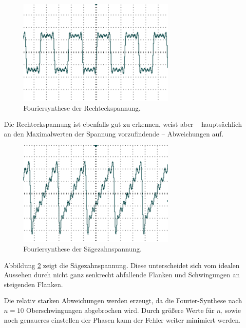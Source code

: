 \begin{figure}
	\centering
		\includegraphics[width=0.7\textwidth]{Bilder/1-9_RE.pdf}		
\caption{Fouriersynthese der Rechteckspannung.}
	\label{fig:1-9_RE}
\end{figure}
Die Rechteckspannung ist ebenfalls gut zu erkennen, weist aber -- hauptsächlich an den Maximalwerten der Spannung vorzufindende -- Abweichungen auf. 

\begin{figure}
	\centering
		\includegraphics[width=0.7\textwidth]{Bilder/1-9_SZ.pdf}		
\caption{Fouriersynthese der Sägezahnspannung.}
	\label{fig:1-9_SZ}
\end{figure}
Abbildung \ref{fig:1-9_SZ} zeigt die Sägezahnspannung. Diese unterscheidet sich vom idealen Aussehen durch nicht ganz senkrecht abfallende Flanken und Schwingungen an steigenden Flanken.

Die relativ starken Abweichungen werden erzeugt, da die Fourier-Synthese nach $n=10$ Oberschwingungen abgebrochen wird. Durch größere Werte für $n$, sowie noch genaueres einstellen der Phasen kann der Fehler weiter minimiert werden.
